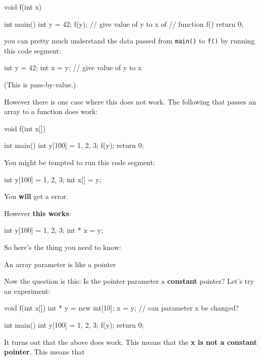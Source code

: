 \begin{consolethree}[escapeinside=||]
void f(int x)
{}

int main()
{
    int y = 42;
    f(y); // give value of y to x of
          // function f()
    return 0;
}
\end{consolethree}

you can pretty much understand the data passed from \texttt{main()} to
\texttt{f()} by running this code segment:

\begin{consolethree}[escapeinside=||]
int y = 42;
int x = y; // give value of y to x
\end{consolethree}

(This is pass-by-value.)

However there is one case where this does not work. The following that
passes an array to a function does work:

\begin{consolethree}[escapeinside=||]
void f(int x[])
{}

int main()
{
    int y[100] = {1, 2, 3};
    f(y);
    return 0;
}
\end{consolethree}

You might be tempted to run this code segment:

\begin{consolethree}[escapeinside=||]
int y[100] = {1, 2, 3};
int x[] = y;
\end{consolethree}

You \textbf{will} get a error.

However \textbf{this works}:

\begin{consolethree}[escapeinside=||]
int y[100] = {1, 2, 3};
int * x = y;
\end{consolethree}

So here's the thing you need to know:

An array parameter is like a pointer

Now the question is this: Is the pointer parameter a
\textbf{constant} pointer? Let's try an experiment:

\begin{consolethree}[escapeinside=||]
void f(int x[])
{
    int * y = new int[10];
    x = y; // can parameter x be changed?
}

int main()
{
    int y[100] = {1, 2, 3};
    f(y);
    return 0;
}
\end{consolethree}

It turns out that the above does work. This means that the \textbf{x is
not a constant pointer}. This means that

